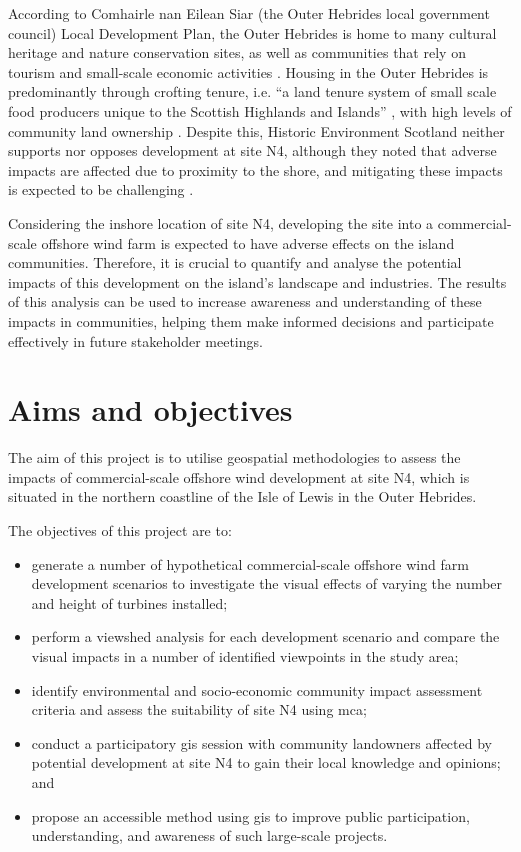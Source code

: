 According to Comhairle nan Eilean Siar (the Outer Hebrides local government council) Local Development Plan, the Outer Hebrides is home to many cultural heritage and nature conservation sites, as well as communities that rely on tourism and small-scale economic activities \autocite{cnes-ldp}. Housing in the Outer Hebrides is predominantly through crofting tenure, i.e. ``a land tenure system of small scale food producers unique to the Scottish Highlands and Islands'' \autocite{crofting}, with high levels of community land ownership \autocite{cnes-ldp}. Despite this, Historic Environment Scotland neither supports nor opposes development at site N4, although they noted that adverse impacts are affected due to proximity to the shore, and mitigating these impacts is expected to be challenging \autocite{govscot-smpresponses}.

Considering the inshore location of site N4, developing the site into a commercial-scale offshore wind farm is expected to have adverse effects on the island communities. Therefore, it is crucial to quantify and analyse the potential impacts of this development on the island's landscape and industries. The results of this analysis can be used to increase awareness and understanding of these impacts in communities, helping them make informed decisions and participate effectively in future stakeholder meetings.

\section{Aims and objectives}

The aim of this project is to utilise geospatial methodologies to assess the impacts of commercial-scale offshore wind development at site N4, which is situated in the northern coastline of the Isle of Lewis in the Outer Hebrides.

\noindent The objectives of this project are to:

\begin{itemize}[noitemsep]
  \item generate a number of hypothetical commercial-scale offshore wind farm development scenarios to investigate the visual effects of varying the number and height of turbines installed;
  \item perform a viewshed analysis for each development scenario and compare the visual impacts in a number of identified viewpoints in the study area;
  \item identify environmental and socio-economic community impact assessment criteria and assess the suitability of site N4 using \gls{mca};
  \item conduct a participatory \gls{gis} session with community landowners affected by potential development at site N4 to gain their local knowledge and opinions; and
  \pagebreak
  \item propose an accessible method using \gls{gis} to improve public participation, understanding, and awareness of such large-scale projects.
\end{itemize}
